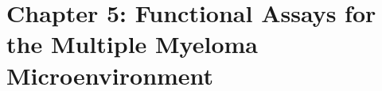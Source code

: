 \chapter{Chapter 5: Functional Assays for the Multiple Myeloma Microenvironment}
\label{Chap:MMAssays}

